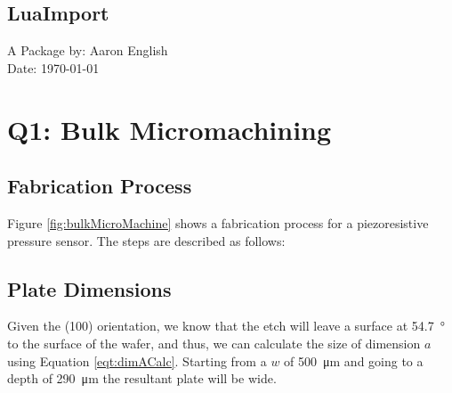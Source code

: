 \documentclass[hidelinks, 12pt]{article}%
\begin{document}
    \frontmatter
        \begin{center}
            \vspace*{1cm}
            \section*{\Huge LuaImport}%
            \vspace{6cm}
            \begin{centering}
                \Large{A Package by: Aaron English\\
                Date: \today}
            \end{centering}
        \end{center}
        \thispagestyle{empty}

    \clearpage
    \mainmatter
        \section{Q1: Bulk Micromachining}
            \subsection{Fabrication Process}
                Figure \ref{fig:bulkMicroMachine} shows a fabrication process for a piezoresistive
                pressure sensor.
                The steps are described as follows:

            \subsection{Plate Dimensions}
                Given the (100) orientation, we know that the etch will leave a surface at 
                \SI{54.7}{\degree} to the surface of the wafer, and thus, we can calculate the size
                of dimension $a$ using Equation \ref{eqt:dimACalc}.
                Starting from a $w$ of \SI{500}{\micro\meter} and going to a depth of 
                \SI{290}{\micro\meter} the resultant plate will be 
                 wide.
\end{document}
